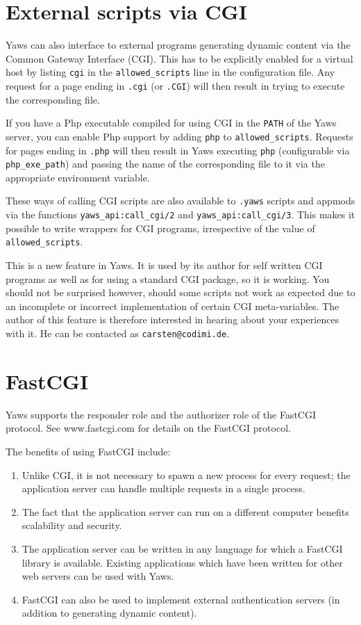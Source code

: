 \documentclass[11pt,oneside,english]{book}
\begin{document}
\chapter{External scripts via CGI}

Yaws can also interface to external programs generating dynamic
content via the Common Gateway Interface (CGI).  This has to be
explicitly enabled for a virtual host by listing \verb+cgi+ in the
\verb+allowed_scripts+ line in the configuration file.  Any request
for a page ending in \verb+.cgi+ (or \verb+.CGI+) will then result in
trying to execute the corresponding file.

If you have a Php executable compiled for using CGI in the \verb+PATH+
of the Yaws server, you can enable Php support by adding \verb+php+ to
\verb+allowed_scripts+.  Requests for pages ending in \verb+.php+ will
then result in Yaws executing \verb+php+ (configurable via
\verb+php_exe_path+) and passing the name of the corresponding file to
it via the appropriate environment variable.

These ways of calling CGI scripts are also available to \verb+.yaws+
scripts and appmods via the functions \verb+yaws_api:call_cgi/2+ and
\verb+yaws_api:call_cgi/3+.  This makes it possible to write wrappers
for CGI programs, irrespective of the value of \verb+allowed_scripts+.

This is a new feature in Yaws.  It is used by its author for self
written CGI programs as well as for using a standard CGI package, so
it is working.  You should not be surprised however, should some
scripts not work as expected due to an incomplete or incorrect
implementation of certain CGI meta-variables.  The author of this
feature is therefore interested in hearing about your experiences with
it.  He can be contacted as \verb+carsten@codimi.de+.

\chapter{FastCGI}

Yaws supports the responder role and the authorizer role of the
FastCGI protocol. See www.fastcgi.com for details on the FastCGI
protocol.

The benefits of using FastCGI include:
\begin{enumerate}
\item Unlike CGI, it is not necessary to spawn a new process for
every request; the application server can handle multiple requests
in a single process.
\item The fact that the application server can run on a different
computer benefits scalability and security.
\item The application server can be written in any language for
which a FastCGI library is available. Existing applications
which have been written for other web servers can be used with
Yaws.
\item FastCGI can also be used to implement external authentication
servers (in addition to generating dynamic content).
\end{enumerate}
\end{document}
